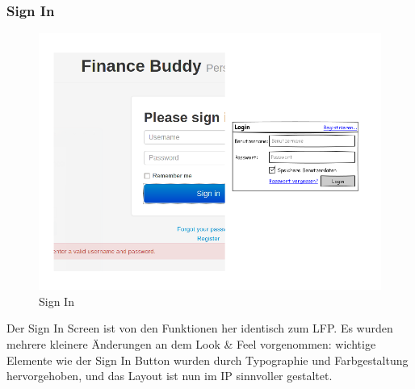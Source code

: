 \documentclass[a4paper,10pt]{article}
\begin{document}

\clearpage
\subsubsection{Sign In}

\begin{figure}
\centering
\includegraphics[width=\textwidth]{sign-in}
\caption{Sign In} \label{fig:sign-in}
\end{figure}

Der Sign In Screen ist von den Funktionen her identisch zum LFP. Es wurden mehrere
kleinere \"Anderungen an dem Look \& Feel vorgenommen: wichtige Elemente wie der
Sign In Button wurden durch Typographie und Farbgestaltung hervorgehoben, und das Layout
ist nun im IP sinnvoller gestaltet.
\end{document}
